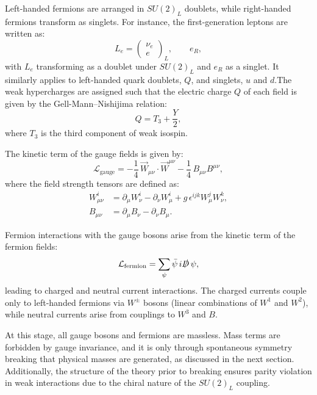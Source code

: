 \documentclass[11pt,twoside]{book}
\begin{document}
Left-handed fermions are arranged in $SU(2)_L$ doublets, while right-handed fermions transform as singlets. For instance, the first-generation leptons are written as:
\begin{equation}
L_e =
\begin{pmatrix}
\nu_e \\
e
\end{pmatrix}_L, \qquad e_R,
\end{equation}
with $L_e$ transforming as a doublet under $SU(2)_L$ and $e_R$ as a singlet. It similarly applies to left-handed quark doublets, $Q$, and singlets, $u$ and $d$.The weak hypercharges are assigned such that the electric charge $Q$ of each field is given by the Gell-Mann–Nishijima relation:
\begin{equation}
Q = T_3 + \frac{Y}{2},
\end{equation}
where $T_3$ is the third component of weak isospin.

The kinetic term of the gauge fields is given by:
\begin{equation}
\mathcal{L}_{\text{gauge}} = -\frac{1}{4} \, \vec{W}_{\mu\nu} \cdot \vec{W}^{\mu\nu} - \frac{1}{4} \, B_{\mu\nu} B^{\mu\nu},
\end{equation}
where the field strength tensors are defined as:
\begin{align}
W_{\mu\nu}^i &= \partial_\mu W_\nu^i - \partial_\nu W_\mu^i + g \, \epsilon^{ijk} W_\mu^j W_\nu^k, \\
B_{\mu\nu} &= \partial_\mu B_\nu - \partial_\nu B_\mu.
\end{align}

Fermion interactions with the gauge bosons arise from the kinetic term of the fermion fields:
\begin{equation}
\mathcal{L}_{\text{fermion}} = \sum_{\psi} \bar{\psi} \, i \slashed{D} \, \psi,
\end{equation}
leading to charged and neutral current interactions. The charged currents couple only to left-handed fermions via $W^\pm$ bosons (linear combinations of $W^1$ and $W^2$), while neutral currents arise from couplings to $W^3$ and $B$.

At this stage, all gauge bosons and fermions are massless. Mass terms are forbidden by gauge invariance, and it is only through spontaneous symmetry breaking that physical masses are generated, as discussed in the next section. Additionally, the structure of the theory prior to breaking ensures parity violation in weak interactions due to the chiral nature of the $SU(2)_L$ coupling.
\end{document}
